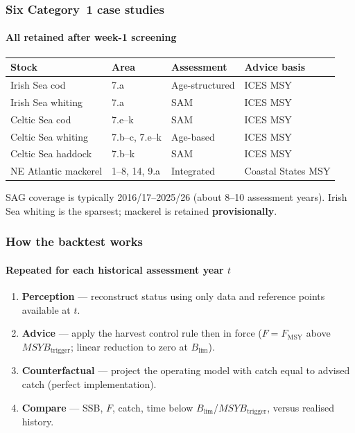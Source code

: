 \documentclass[
  aspectratio=169,
  t,
  onlytextwidth,
  10pt,
]{beamer}
\newcommand{\Fmsy}{F_{\mathrm{MSY}}}
\newcommand{\Blim}{B_{\lim}}
\newcommand{\Btrig}{MSYB_{\mathrm{trigger}}}
\begin{document}
\begin{frame}
  \frametitle{Six Category~1 case studies}
  \framesubtitle{All retained after week-1 screening}

  {\small
  \begin{tabular}{@{}llll@{}}
    \toprule
    Stock & Area & Assessment & Advice basis \\
    \midrule
    Irish Sea cod & 7.a & Age-structured & ICES MSY \\
    Irish Sea whiting & 7.a & SAM & ICES MSY \\
    Celtic Sea cod & 7.e--k & SAM & ICES MSY \\
    Celtic Sea whiting & 7.b--c, 7.e--k & Age-based & ICES MSY \\
    Celtic Sea haddock & 7.b--k & SAM & ICES MSY \\
    NE Atlantic mackerel & 1--8, 14, 9.a & Integrated & Coastal States MSY \\
    \bottomrule
  \end{tabular}}

  \vspace{0.6em}
  SAG coverage is typically 2016/17--2025/26 (about 8--10 assessment years).
  Irish Sea whiting is the sparsest; mackerel is retained \textbf{provisionally}.
\end{frame}

\begin{frame}
  \frametitle{How the backtest works}
  \framesubtitle{Repeated for each historical assessment year $t$}

  \begin{enumerate}
    \item \textbf{Perception} --- reconstruct status using only data and reference points available at $t$.
    \item \textbf{Advice} --- apply the harvest control rule then in force
          ($F=\Fmsy$ above $\Btrig$; linear reduction to zero at $\Blim$).
    \item \textbf{Counterfactual} --- project the operating model with catch equal to advised catch (perfect implementation).
    \item \textbf{Compare} --- SSB, $F$, catch, time below $\Blim$/$\Btrig$, versus realised history.
  \end{enumerate}
\end{frame}
\end{document}
